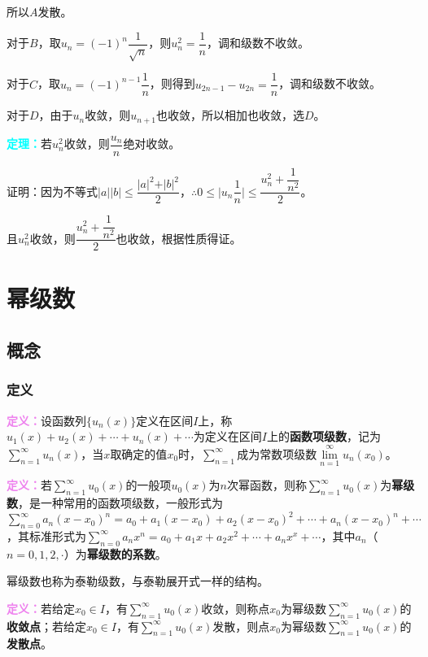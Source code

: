\documentclass[UTF8, 12pt]{ctexart}
\begin{document}
所以$A$发散。

对于$B$，取$u_n=(-1)^n\dfrac{1}{\sqrt{n}}$，则$u_n^2=\dfrac{1}{n}$，调和级数不收敛。

对于$C$，取$u_n=(-1)^{n-1}\dfrac{1}{n}$，则得到$u_{2n-1}-u_{2n}=\dfrac{1}{n}$，调和级数不收敛。

对于$D$，由于$u_n$收敛，则$u_{n+1}$也收敛，所以相加也收敛，选$D$。

\textcolor{aqua}{\textbf{定理：}}若$u_n^2$收敛，则$\dfrac{u_n}{n}$绝对收敛。

证明：因为不等式$\vert a\vert\vert b\vert\leqslant\dfrac{\vert a\vert^2+\vert b\vert^2}{2}$，$\therefore0\leqslant\vert u_n\dfrac{1}{n}\vert\leqslant\dfrac{u_n^2+\dfrac{1}{n^2}}{2}$。

且$u_n^2$收敛，则$\dfrac{u_n^2+\dfrac{1}{n^2}}{2}$也收敛，根据性质得证。

\section{幂级数}

\subsection{概念}

\subsubsection{定义}

\textcolor{violet}{\textbf{定义：}}设函数列$\{u_n(x)\}$定义在区间$I$上，称$u_1(x)+u_2(x)+\cdots+u_n(x)+\cdots$为定义在区间$I$上的\textbf{函数项级数}，记为$\sum\limits_{n=1}^\infty u_n(x)$，当$x$取确定的值$x_0$时，$\sum\limits_{n=1}^\infty$成为常数项级数$\lim\limits_{n=1}^\infty u_n(x_0)$。

\textcolor{violet}{\textbf{定义：}}若$\sum\limits_{n=1}^\infty u_0(x)$的一般项$u_0(x)$为$n$次幂函数，则称$\sum\limits_{n=1}^\infty u_0(x)$为\textbf{幂级数}，是一种常用的函数项级数，一般形式为$\sum\limits_{n=0}^\infty a_n(x-x_0)^n=a_0+a_1(x-x_0)+a_2(x-x_0)^2+\cdots+a_n(x-x_0)^n+\cdots$，其标准形式为$\sum\limits_{n=0}^\infty a_nx^n=a_0+a_1x+a_2x^2+\cdots+a_nx^x+\cdots$，其中$a_n$（$n=0,1,2,\cdot$）为\textbf{幂级数的系数}。

幂级数也称为泰勒级数，与泰勒展开式一样的结构。

\textcolor{violet}{\textbf{定义：}}若给定$x_0\in I$，有$\sum\limits_{n=1}^\infty u_0(x)$收敛，则称点$x_0$为幂级数$\sum\limits_{n=1}^\infty u_0(x)$的\textbf{收敛点}；若给定$x_0\in I$，有$\sum\limits_{n=1}^\infty u_0(x)$发散，则点$x_0$为幂级数$\sum\limits_{n=1}^\infty u_0(x)$的\textbf{发散点}。
\end{document}
